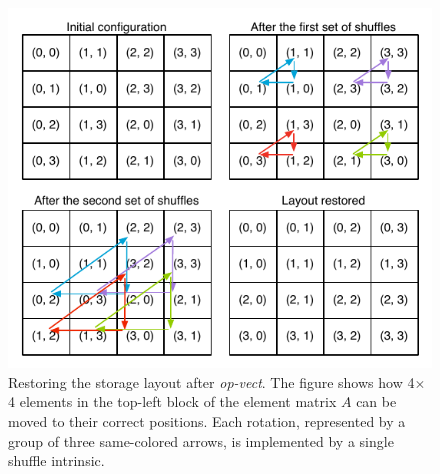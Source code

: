\documentclass[conference]{IEEEtran}
\begin{document}
\begin{figure}[t]
\centerline{\includegraphics[scale=0.60]{Pictures/vect-restore.pdf}}
\caption{Restoring the storage layout after \emph{op-vect}. The figure shows how 4$\times$4 elements in the top-left block of the element matrix $A$ can be moved to their correct positions. Each rotation, represented by a group of three same-colored arrows, is implemented by a single shuffle intrinsic.}
\label{fig:restore-layout}
\end{figure}

\end{document}
